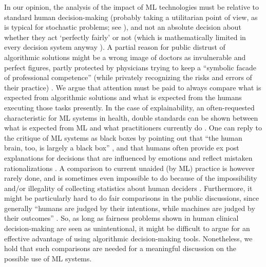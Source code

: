     In our opinion, the analysis of the impact of ML technologies must be relative to standard human decision-making (probably taking a utilitarian point of view, as is typical for stochastic problems; see \cite{Hardin1989}), and not an absolute decision about whether they act `perfectly fairly' or not (which is mathematically limited in every decision system anyway \cite{Zerilli2019}).
    A partial reason for public distrust of algorithmic solutions might be a wrong image of doctors as invulnerable and perfect figures, partly protected by physicians trying to keep a ``symbolic facade of professional competence'' (while privately recognizing the risks and errors of their practice) \cite{Waring2005}.
    We argue that attention must be paid to always compare what is expected from algorithmic solutions and what is expected from the humans executing those tasks presently.
    In the case of explainability, an often-requested characteristic for ML systems in health, double standards can be shown between what is expected from ML and what practitioners currently do \cite{Zerilli2019}.
    One can reply to the critique of ML systems as black boxes by pointing out that ``the human brain, too, is largely a black box'' \cite[p.~666]{Zerilli2019}, and that humans often provide ex post explanations for decisions that are influenced by emotions and reflect mistaken rationalizations \cite{Zerilli2019}.
    A comparison to current unaided (by ML) practice is however rarely done, and is sometimes even impossible to do because of the impossibility and/or illegality of collecting statistics about human deciders \cite{Williamson2021}.
    Furthermore, it might be particularly hard to do fair comparisons in the public discussions, since generally ``humans are judged by their intentions, while machines are judged by their outcomes'' \cite[p.~139]{Hidalgo2021}.
    So, as long as fairness problems shown in human clinical decision-making are seen as unintentional, it might be difficult to argue for an effective advantage of using algorithmic decision-making tools.
    Nonetheless, we hold that such comparisons are needed for a meaningful discussion on the possible use of ML systems.

